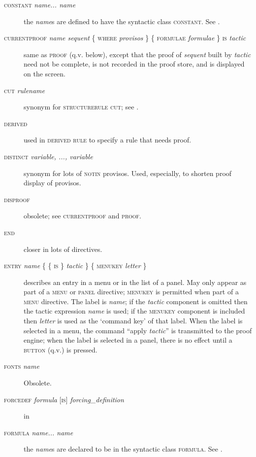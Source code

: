 \begin{description}
\item[\textsc{constant} \textit{name... name}] the \textit{name}s are defined to have the syntactic class \textsc{constant}. See .

\item[\textsc{currentproof} \textit{name sequent} \{ \textsc{where} \textit{provisos} \} \{ \textsc{formulae} \textit{formulae} \} \textsc{is} \textit{tactic}] same as \textsc{proof} (q.v. below), except that the proof of \textit{sequent} built by \textit{tactic} need not be complete, is not recorded in the proof store, and is displayed on the screen.

\item[\textsc{cut} \textit{rulename}] synonym for \textsc{structurerule} \textsc{cut}; see .

\item[\textsc{derived}] used in \textsc{derived rule} to specify a rule that needs proof.

\item[\textsc{distinct} \textit{variable, ..., variable}] synonym for lots of \textsc{notin} provisos. Used, especially, to shorten proof display of provisos.

\item[\textsc{disproof}] obsolete; see \textsc{currentproof} and \textsc{proof}.

\item[\textsc{end}] closer in lots of directives.

\item[\textsc{entry} \textit{name} \{ \{ \textsc{is} \} \textit{tactic} \} \{ \textsc{menukey} \textit{letter} \}] describes an entry in a menu or in the list of a panel. May only appear as part of a \textsc{menu} or \textsc{panel} directive; \textsc{menukey} is permitted when part of a \textsc{menu} directive. The label is \textit{name}; if the \textit{tactic} component is omitted then the tactic expression \textit{name} is used; if the \textsc{menukey} component is included then \textit{letter} is used as the `command key' of that label. When the label is selected in a menu, the command ``apply \textit{tactic}'' is transmitted to the proof engine; when the label is selected in a panel, there is no effect until a \textsc{button} (q.v.) is pressed.

\item[\textsc{fonts} \textit{name}] Obsolete.

\item[\textsc{forcedef} \textit{formula} {[}\textsc{is}{]} \textit{forcing\_definition}] in
\item[\textsc{formula} \textit{name... name}] the \textit{name}s are declared to be in the syntactic class \textsc{formula}. See .


\end{description}
